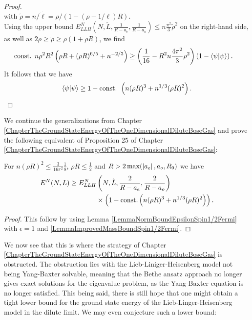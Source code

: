 \begin{proof}
\begin{equation}
	\end{equation}
	with $ \tilde{\rho}=n/\tilde{\ell}=\rho/(1-(\rho-1/\ell)R)$.\\
	Using the upper bound $ E_{LLH}^N \left(N,\tilde{L},\frac{1}{R-a_e},\frac{1}{R-a_o}\right)\leq n\frac{\pi^2}{3}\tilde{\rho}^2 $ on the right-hand side, as well as $ 2\rho \geq\tilde{\rho}\geq \rho(1+\rho R)$, we find
	\begin{equation}
	\begin{aligned}
	\text{const. }n\rho^2R^2\left(\rho R+(\rho R)^{6/5}+n^{-2/3}\right)&\geq \left(\frac{1}{16}-R^2n\frac{4\pi^2}{3}\rho^2\right)\left(1-\left\langle\psi|\psi\right\rangle\right).
	\end{aligned}
	\end{equation}
	It follows that we have \begin{equation}
	\left\langle\psi|\psi\right\rangle\geq 1-\text{const. }\left(n(\rho R)^3+n^{1/3}(\rho R)^2\right).
	\end{equation}
\end{proof}
We continue the generalizations from Chapter \ref{ChapterTheGroundStateEnergyOfTheOneDimensionalDiluteBoseGas} and prove the following equivalent of Proposition 25 of Chapter \ref{ChapterTheGroundStateEnergyOfTheOneDimensionalDiluteBoseGas}:
\begin{proposition}
	\label{PropositionLowerBoundSpecNSpin1/2Fermi}
	For $ n(\rho R)^2\leq  \frac{3}{16\pi^2}\frac{1}{8} $, $ \rho R\leq \frac{1}{2} $ and $ R>2\max(\left\lvert a_e \right\rvert,a_o,R_0) $ we have \begin{equation}
	\begin{aligned}
	E^N(N,L)\geq E_{LLH}^N&\left(N,\tilde{L},\frac{2}{R-a_e},\frac{2}{R-a_o}\right)\\&\times\left(1-\textnormal{const.}\left(n(\rho R)^3+n^{1/3}(\rho R)^2\right)\right).
	\end{aligned}
	\end{equation}
\end{proposition}
\begin{proof}
	This follow by using Lemma \ref{LemmaNormBoundEpsilonSpin1/2Fermi} with $ \epsilon=1 $ and \ref{LemmaImprovedMassBoundSpin1/2Fermi}.
\end{proof}
We now see that this is where the strategy of Chapter \ref{ChapterTheGroundStateEnergyOfTheOneDimensionalDiluteBoseGas} is obstructed. The obstruction lies with the Lieb-Liniger-Heisenberg model not being Yang-Baxter solvable, meaning that the Bethe ansatz approach no longer gives exact solutions for the eigenvalue problem, as the Yang-Baxter equation is no longer satisfied. This being said, there is still hope that one might obtain a tight lower bound for the ground state energy of the Lieb-Linger-Heisenberg model in the dilute limit. We may even conjecture such a lower bound:
